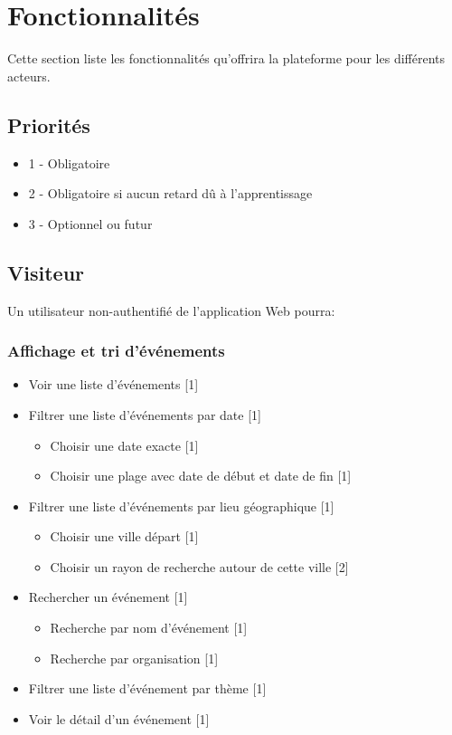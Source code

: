 \documentclass[11pt, a4paper, french, twoside]{article}
\begin{document}
	\section{Fonctionnalités}
	\label{sec:fonctionnalites}
		Cette section liste les fonctionnalités qu'offrira la plateforme pour les différents acteurs. 
		
		\subsection{Priorités}
		\label{subsec:priorites}
		
		\begin{itemize}
			\item 1 - Obligatoire
			\item 2 - Obligatoire si aucun retard dû à l'apprentissage
			\item 3 - Optionnel ou futur
		\end{itemize}
		
		\subsection{Visiteur}
		\label{subsec:visiteur}
			Un utilisateur non-authentifié de l'application Web pourra: 
			
			\subsubsection{Affichage et tri d'événements}
			\label{subsubsec:affichage_tri_evenements}
			
				\begin{itemize}
					\item Voir une liste d'événements [1]
					\item Filtrer une liste d'événements par date [1]
						\begin{itemize}
							\item Choisir une date exacte [1]
							\item Choisir une plage avec date de début et date de fin [1]
						\end{itemize}
					\item Filtrer une liste d'événements par lieu géographique [1]
						\begin{itemize}
							\item Choisir une ville départ [1]
							\item Choisir un rayon de recherche autour de cette ville [2]
						\end{itemize}
					\item Rechercher un événement [1]
						\begin{itemize}
							\item Recherche par nom d'événement [1]
							\item Recherche par organisation [1]
						\end{itemize}
					\item Filtrer une liste d'événement par thème [1]
					\item Voir le détail d'un événement [1] 
				\end{itemize}
			
\end{document}
